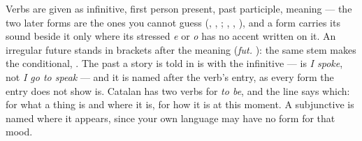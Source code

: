 {\smallskip
Verbs are given as infinitive, first person present, past participle,
meaning — the two later forms are the ones you cannot guess (,
, ; , , ), and a form
carries its sound beside it only where its stressed \textit{e} or \textit{o}
has no accent written on it. An irregular future stands in brackets after the
meaning (\textit{fut.} ): the same stem makes the conditional,
. The past a story is told in is  with the infinitive
—  is \textit{I spoke}, not \textit{I go to speak} — and it is
named after the verb's entry, as every form the entry does not show is. Catalan
has two verbs for \textit{to be}, and the line says which:  for what a
thing is and where it is,  for how it is at this moment. A
subjunctive is named where it appears, since your own language may have no
form for that mood.
}
